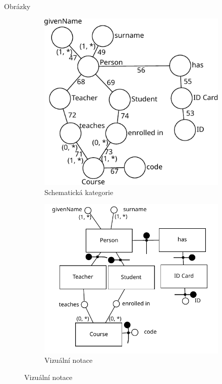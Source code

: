 \documentclass[a0paper]{uioposter}
\begin{document}
\begin{frame}
\begin{block}{Obrázky}
\begin{figure}
\begin{subfigure}{0.2604\textwidth}
        \includegraphics[width=\textwidth]{./images/university-schemcat.pdf}
        \caption*{Schematická kategorie}
      \end{subfigure}
      \begin{subfigure}{0.3\textwidth}
        \includegraphics[width=\textwidth]{./images/university-scv.pdf}
        \caption*{Vizuální notace}
      \end{subfigure}
    \end{figure}
  \end{block}


\end{frame}
\end{document}
